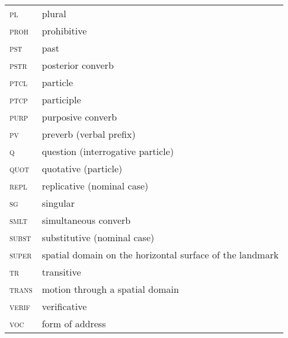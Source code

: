 \begin{longtable}{@{}ll@{}}
\textsc{pl}	& plural \\
\textsc{proh}	& prohibitive \\
\textsc{pst}	& past \\
\textsc{pstr}	& posterior converb \\
\textsc{ptcl}	& particle \\
\textsc{ptcp}	& participle \\
\textsc{purp}	& purposive converb \\
\textsc{pv}	& preverb (verbal prefix) \\
\textsc{q}	& question (interrogative particle) \\
\textsc{quot}	& quotative (particle) \\
\textsc{repl}	& replicative (nominal case) \\
\textsc{sg}	& singular \\
\textsc{smlt}	& simultaneous converb \\
\textsc{subst}	& substitutive (nominal case) \\
\textsc{super}	& spatial domain on the horizontal surface of the landmark \\
\textsc{tr}	& transitive \\
\textsc{trans}	& motion through a spatial domain \\
\textsc{verif}	& verificative \\
\textsc{voc}	& form of address \\
\end{longtable} 
 
